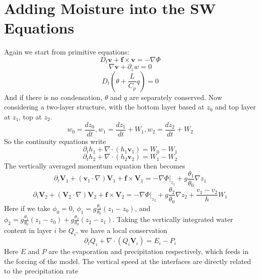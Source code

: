 \documentclass{article}
\begin{document}
\section{Adding Moisture into the SW Equations}
Again we start from primitive equations:
\begin{equation}
    D_t \mathbf{v}+\mathbf{f}\times\mathbf{v}=-\nabla\Phi
\end{equation}
\begin{equation}
    \nabla \mathbf{v}+\partial_z w=0
\end{equation}
\begin{equation}
    D_t(\theta+\frac{L}{C_p}q)=0
\end{equation}
And if there is no condensation, $\theta$ and $q$ are separately conserved. Now considering a two-layer structure, with the bottom layer based at $z_0$ and top layer at $z_1$, top at $z_2$.
\begin{equation}
    w_0=\frac{dz_0}{dt}, w_1=\frac{dz_1}{dt}+W_1, w_2=\frac{dz_2}{dt}+W_2
\end{equation}
So the continuity equations write
\begin{equation}
    \partial_t h_1 + \nabla\cdot(h_1\mathbf{v}_1)=W_0-W_1
\end{equation}
\begin{equation}
    \partial_t h_2 + \nabla\cdot(h_2\mathbf{v}_2)=W_1-W_2
\end{equation}
The vertically averaged momentum equation then becomes
\begin{equation}
    \partial_t \mathbf{V}_1+(\mathbf{v}_1\cdot\nabla)\mathbf{V}_1+\mathbf{f}\times\mathbf{V}_1=-\nabla \Phi|_{z_1}+g\frac{\theta_1}{\theta_0}\nabla z_1
\end{equation}
\begin{equation}
    \partial_t \mathbf{V}_2+(\mathbf{V}_2\cdot\nabla)\mathbf{V}_2+\mathbf{f}\times\mathbf{V}_2=-\nabla \Phi|_{z_2}+g\frac{\theta_2}{\theta_0}\nabla z_2+\frac{v_1-v_2}{h}W_1
\end{equation}
Here if we take $\phi_0=0$, $\phi_1=g\frac{\theta_1}{\theta_0}(z_1-z_0)$, and $\phi_2=g\frac{\theta_1}{\theta_0}(z_1-z_0)+g\frac{\theta_2}{\theta_0}(z_2-z_1)$. Taking the vertically integrated water content in layer $i$ be $Q_i$, we have a local conservation
\begin{equation}
    \partial_t Q_i+\nabla\cdot(Q_i\mathbf{V}_i)=E_i-P_i
\end{equation}
Here $E$ and $P$ are the evaporation and precipitation respectively, which feeds in the forcing of the model. The vertical speed at the interfaces are directly related to the precipitation rate
\end{document}
